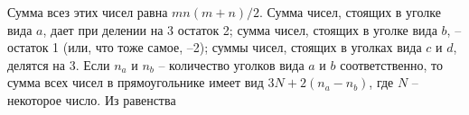 \documentclass[russian,10pt,a4paper,twocolumn]{article}
\begin{document}
	\noindent
	Сумма всез этих чисел равна $mn(m+n)/2$. Сумма чисел, стоящих в уголке вида $a$, дает при делении на 3 остаток 2; сумма чисел, стоящих в уголке вида $b$, -- остаток 1 (или, что тоже самое, --2); суммы чисел, стоящих в уголках вида $c$ и $d$, делятся на 3. Если $n_a$ и $n_b$ -- количество уголков вида $a$ и $b$ соответственно, то сумма всех чисел в прямоугольнике имеет вид $3N+2(n_a-n_b)$, где $N$ -- некоторое число. Из равенства
	
	

	
	
\end{document}
